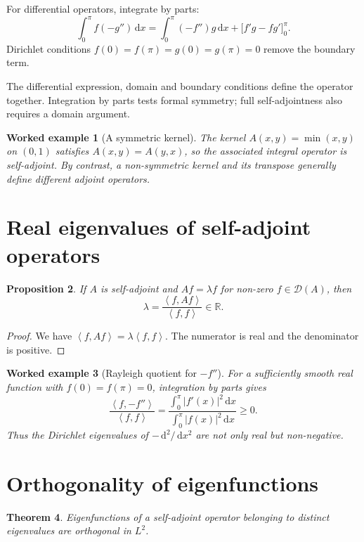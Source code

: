 \documentclass[11pt,a5paper,oneside,openany]{scrreprt}
\theoremstyle{notes}
\newtheorem{theorem}{Theorem}[section]
\newtheorem{proposition}[theorem]{Proposition}
\theoremstyle{definitions}
\newtheorem{example}[theorem]{Worked example}
\newcommand{\R}{\mathbb{R}}
\newcommand{\ip}[2]{\left\langle #1,#2\right\rangle}
\newcommand{\dd}{\,\mathrm{d}}
\begin{document}
For differential operators, integrate by parts:
\[
 \int_0^\pi f(-g'')\dd x
 =\int_0^\pi(-f'')g\dd x
 +\bigl[f'g-fg'\bigr]_{0}^{\pi}.
\]
Dirichlet conditions $f(0)=f(\pi)=g(0)=g(\pi)=0$ remove the boundary term.

\begin{caution}
The differential expression, domain and boundary conditions define the
operator together.  Integration by parts tests formal symmetry; full
self-adjointness also requires a domain argument.
\end{caution}

\begin{example}[A symmetric kernel]
The kernel $A(x,y)=\min(x,y)$ on $(0,1)$ satisfies $A(x,y)=A(y,x)$, so the
associated integral operator is self-adjoint.  By contrast, a non-symmetric
kernel and its transpose generally define different adjoint operators.
\end{example}

\section{Real eigenvalues of self-adjoint operators}

\begin{proposition}
If $A$ is self-adjoint and $Af=\lambda f$ for non-zero
$f\in\mathcal D(A)$, then
\[
 \boxed{\lambda=\frac{\ip{f}{Af}}{\ip{f}{f}}\in\R}.
\]
\end{proposition}

\begin{proof}
We have $\ip{f}{Af}=\lambda\ip{f}{f}$.  The numerator is real and the
denominator is positive.
\end{proof}

\begin{example}[Rayleigh quotient for $-f''$]
For a sufficiently smooth real function with $f(0)=f(\pi)=0$, integration by
parts gives
\[
 \frac{\ip{f}{-f''}}{\ip{f}{f}}
 =\frac{\int_0^\pi|f'(x)|^2\dd x}
 {\int_0^\pi|f(x)|^2\dd x}\ge0.
\]
Thus the Dirichlet eigenvalues of $-\dd^2/\dd x^2$ are not only real but
non-negative.
\end{example}

\section{Orthogonality of eigenfunctions}

\begin{theorem}
Eigenfunctions of a self-adjoint operator belonging to distinct eigenvalues
are orthogonal in $L^2$.
\end{theorem}
\end{document}
